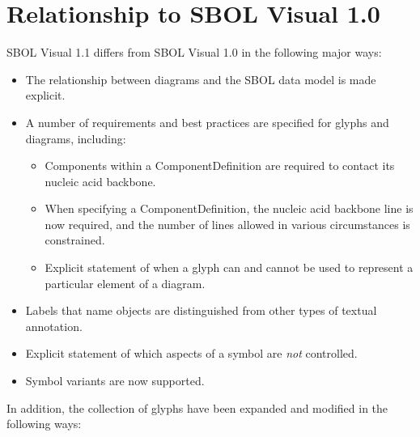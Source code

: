 \section{Relationship to SBOL Visual 1.0}\label{sec:sbol1}

SBOL Visual 1.1 differs from SBOL Visual 1.0 in the following major ways:
\begin{itemize}
\item The relationship between diagrams and the SBOL data model is made explicit.
\item A number of requirements and best practices are specified for glyphs and diagrams, including:
	\begin{itemize}
	\item Components within a ComponentDefinition are required to contact its nucleic acid backbone.
	\item When specifying a ComponentDefinition, the nucleic acid backbone line is now required, and the number of lines allowed in various circumstances is constrained.
	\item Explicit statement of when a glyph can and cannot be used to represent a particular element of a diagram.
	\end{itemize}
\item Labels that name objects are distinguished from other types of textual annotation.
\item Explicit statement of which aspects of a symbol are {\em not} controlled.
\item Symbol variants are now supported.
\end{itemize}

In addition, the collection of glyphs have been expanded and modified in the following ways:

